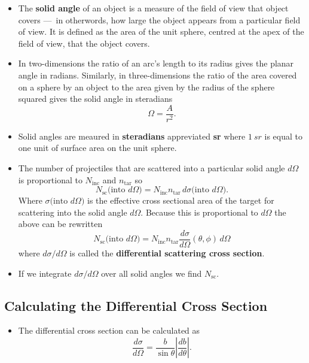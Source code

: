 \documentclass{article}
\begin{document}
\begin{itemize}
  \item The \textbf{solid angle} of an object is a measure of the field of view that object covers — in otherwords, how large the object appears from a particular field of view. It is defined as the area of the unit sphere, centred at the apex of the field of view, that the object covers.

  \item In two-dimensions the ratio of an arc's length to its radius gives the planar angle in radians. Similarly, in three-dimensions the ratio of the area covered on a sphere by an object to the area given by the radius of the sphere squared gives the solid angle in steradians \[\Omega = \frac{A}{r^2}.\]

  \item Solid angles are meaured in \textbf{steradians} appreviated \textbf{sr} where $\qty{1}{sr}$ is equal to one unit of surface area on the unit sphere.

  \item The number of projectiles that are scattered into a particular solid angle $d \Omega$ is proportional to $N_\text{inc}$ and $n_\text{tar}$ so \[N_\text{sc} \text{(into } d \Omega \text{)} = N_\text{inc} n_\text{tar} \,d \sigma \text{(into } d \Omega \text{)}.\] Where $\sigma \text{(into } d \Omega \text{)}$ is the effective cross sectional area of the target for scattering into the solid angle $d \Omega$. Because this is proportional to $d \Omega$ the above can be rewritten \[N_\text{sc} \text{(into } d \Omega \text{)} = N_\text{inc} n_\text{tar} \frac{d \sigma}{d \Omega} (\theta, \phi) \,d \Omega\] where $d \sigma / d \Omega$ is called the \textbf{differential scattering cross section}.

  \item If we integrate $d \sigma / d \Omega$ over all solid angles we find $N_\text{sc}$.
\end{itemize}

\subsection{Calculating the Differential Cross Section}

\begin{itemize}
  \item The differential cross section can be calculated as \[\frac{d \sigma}{d \Omega} = \frac{b}{\sin \theta} \left| \frac{d b}{d \theta} \right|.\]
\end{itemize}
\end{document}
